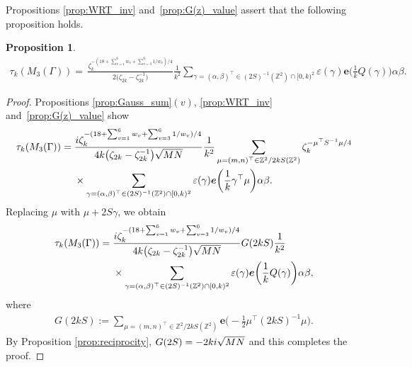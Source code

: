 \documentclass[11pt]{article}
\numberwithin{equation}{section}
\newcommand{\veps}{\varepsilon}
\newcommand{\Z}{\mathbb{Z}}
\numberwithin{equation}{section}
\newtheorem{prop}[Theorem]{Proposition}
 { \theoremstyle{definition}
\newtheorem{dfn}[Theorem]{Definition}
\newtheorem{Note}[Theorem]{Note}
\newtheorem{ex}[Theorem]{Example}
\newtheorem{rem}[Theorem]{Remark}
\newtheorem{assump}[Theorem]{Assumption}
}
\newcommand{\trans}[1]{#1^\top}
\begin{document}
Propositions \ref{prop:WRT_inv} and~\ref{prop:G(z)_value} assert that the following proposition holds.
\begin{prop}%
	\begin{align*}
		\tau_k(M_3(\Gamma)) = \, \frac{\zeta_{k}^{-(18 + \sum_{v=1}^{6}w_{v} + \sum_{v=3}^{6} 1/w_{v})/4}}{2 \big(\zeta_{2k}-\zeta_{2k}^{-1}\big)}
		\frac{1}{k^{2}} \sum_{ \gamma = \trans{(\alpha, \beta)} \in (2S)^{-1}(\Z^2) \cap [0, k)^2}
		\veps(\gamma) \bm{e}\bigg( \frac{1}{k} Q(\gamma) \bigg) \alpha \beta.
	\end{align*}
\end{prop}
\begin{proof}
	Propositions \ref{prop:Gauss_sum}$(v)$, \ref{prop:WRT_inv} and~\ref{prop:G(z)_value} show
	\begin{align*}
		\tau_k(M_3(\Gamma)) = {} &\frac{{\rm i} \zeta_{k}^{-(18 + \sum_{v=1}^{6}w_{v} + \sum_{v=3}^{6} 1/w_{v})/4}}{4k \big(\zeta_{2k}-\zeta_{2k}^{-1}\big) \sqrt{MN}}
		\frac{1}{k^2} \sum_{\mu = \trans{(m, n)} \in \Z^2/2kS(\Z^2)}
		\zeta_k^{-\trans{\mu} S^{-1} \mu/4}
\\
		&\times\sum_{\gamma = \trans{(\alpha, \beta)} \in (2S)^{-1}(\Z^2) \cap [0, k)^2}
		\veps(\gamma) \bm{e}\bigg( \frac{1}{k} \trans{\gamma} \mu \bigg) \alpha \beta.
	\end{align*}
	Replacing $ \mu $ with $ \mu + 2S\gamma $, we obtain
	\begin{align*}
	\tau_k(M_3(\Gamma)) = {}&\frac{{\rm i} \zeta_{k}^{-(18 + \sum_{v=1}^{6}w_{v} + \sum_{v=3}^{6} 1/w_{v})/4}}{4k \big(\zeta_{2k}-\zeta_{2k}^{-1}\big) \sqrt{MN}} G(2kS)
	\frac{1}{k^2}
\\
&\times\sum_{ \gamma = \trans{(\alpha, \beta)} \in (2S)^{-1}(\Z^2) \cap [0, k)^2}
	\veps(\gamma) \bm{e}\bigg( \frac{1}{k} Q(\gamma) \bigg) \alpha \beta,
	\end{align*}
	where
	\begin{gather*}
	G(2kS) := \sum_{\mu = \trans{(m, n)} \in \Z^2/2kS(\Z^2)} \bm{e}\bigg({-}\frac{1}{2} \trans{\mu} (2kS)^{-1} \mu \bigg).
	\end{gather*}
	By Proposition \ref{prop:reciprocity}, $ G(2S) = -2k{\rm i} \sqrt{MN} $ and this completes the proof.
\end{proof}
\end{document}

